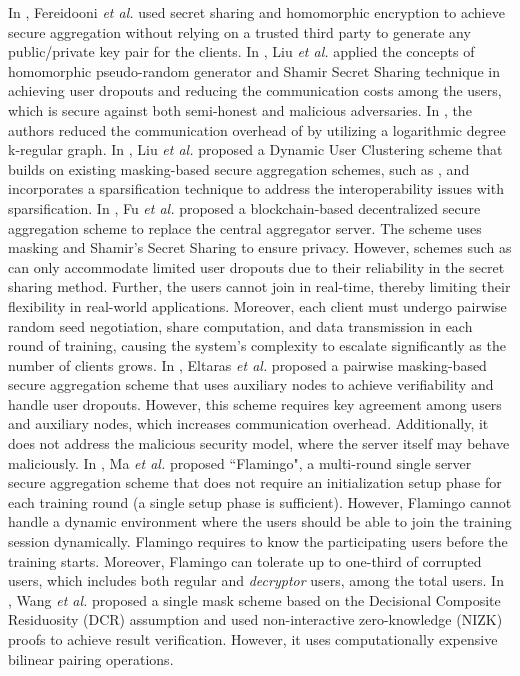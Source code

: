 In \cite{Fereidooni2021}, Fereidooni \emph{et al.} used secret sharing and homomorphic encryption to achieve secure aggregation without relying on a trusted third party to generate any public/private key pair for the clients. In \cite{Liu2023}, Liu \emph{et al.} applied the concepts of homomorphic pseudo-random generator and Shamir Secret Sharing technique in achieving user dropouts and reducing the communication costs among the users, which is secure against both semi-honest and malicious adversaries. In \cite{Bell2020}, the authors reduced the communication overhead of \cite{Bonawitz2017} by utilizing a logarithmic degree k-regular graph. In \cite{Liu2024}, Liu \emph{et al.} proposed a Dynamic User Clustering scheme that builds on existing masking-based secure aggregation schemes, such as \cite{Bonawitz2017}, and incorporates a sparsification technique to address the interoperability issues with sparsification. In \cite{Fu2024}, Fu \emph{et al.} proposed a blockchain-based decentralized secure aggregation scheme to replace the central aggregator server. The scheme uses masking and Shamir's Secret Sharing to ensure privacy. However, schemes such as \cite{Xu2020, Guo2021, Fereidooni2021, Liu2023, Bell2020, Liu2024, Fu2024} can only accommodate limited user dropouts due to their reliability in the secret sharing method. Further, the users cannot join in real-time, thereby limiting their flexibility in real-world applications. 
Moreover, each client must undergo pairwise random seed negotiation, share computation, and data transmission in each round of training, causing the system's complexity to escalate significantly as the number of clients grows. In \cite{Eltaras2023}, Eltaras \emph{et al.} proposed a pairwise masking-based secure aggregation scheme that uses auxiliary nodes to achieve verifiability and handle user dropouts. However, this scheme requires key agreement among users and auxiliary nodes, which increases communication overhead. Additionally, it does not address the malicious security model, where the server itself may behave maliciously. 
In \cite{Ma2023}, Ma \emph{et al.} proposed ``Flamingo", a multi-round single server secure aggregation scheme that does not require an initialization setup phase for each training round (a single setup phase is sufficient). 
However, Flamingo cannot handle a dynamic environment where the users should be able to join the training session dynamically. Flamingo requires to know the participating users before the training starts. Moreover, Flamingo can tolerate up to one-third of corrupted users, which includes both regular and \emph{decryptor} users, among the total users. In \cite{Wang2023}, Wang \emph{et al.} proposed a single mask scheme based on the Decisional Composite Residuosity (DCR) assumption and used non-interactive zero-knowledge (NIZK) proofs to achieve result verification. However, it uses computationally expensive bilinear pairing operations. 
